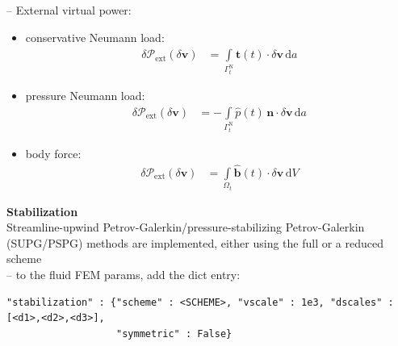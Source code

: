 \documentclass[a4paper,12pt]{report}
\newcommand{\bs}[1]{\boldsymbol{#1}}
\newcommand{\Om}{\mathit{\Omega}}
\newcommand{\Gm}{\mathit{\Gamma}}
\begin{document}
-- External virtual power:\\
\begin{itemize}
\item conservative Neumann load:
\begin{equation}
\label{equation-deltap-ext-cur}
\begin{aligned}
\delta \mathcal{P}_{\mathrm{ext}}(\delta\bs{v}) &= \int\limits_{\Gm_t^{\mathrm{N}}} \hat{\bs{t}}(t) \cdot \delta\bs{v} \,\mathrm{d}a
\end{aligned}
\end{equation}
\item pressure Neumann load:
\begin{equation}
\label{equation-deltap-ext-cur-p}
\begin{aligned}
\delta \mathcal{P}_{\mathrm{ext}}(\delta\bs{v}) &= -\int\limits_{\Gm_t^{\mathrm{N}}} \hat{p}(t)\,\bs{n} \cdot \delta\bs{v} \,\mathrm{d}a
\end{aligned}
\end{equation}
\item body force:
\begin{equation}
\label{equation-deltap-ext-body}
\begin{aligned}
\delta \mathcal{P}_{\mathrm{ext}}(\delta\bs{v}) &= \int\limits_{\Om_t} \hat{\bs{b}}(t) \cdot \delta\bs{v} \,\mathrm{d}V
\end{aligned}
\end{equation}
\end{itemize}

\textbf{Stabilization}\\

Streamline-upwind Petrov-Galerkin/pressure-stabilizing Petrov-Galerkin (SUPG/PSPG) methods are implemented, either using the full or a reduced scheme\\

-- to the fluid FEM params, add the dict entry:

\begin{Verbatim}[breaklines=true]
"stabilization" : {"scheme" : <SCHEME>, "vscale" : 1e3, "dscales" : [<d1>,<d2>,<d3>],
                   "symmetric" : False}
\end{Verbatim}
\end{document}
